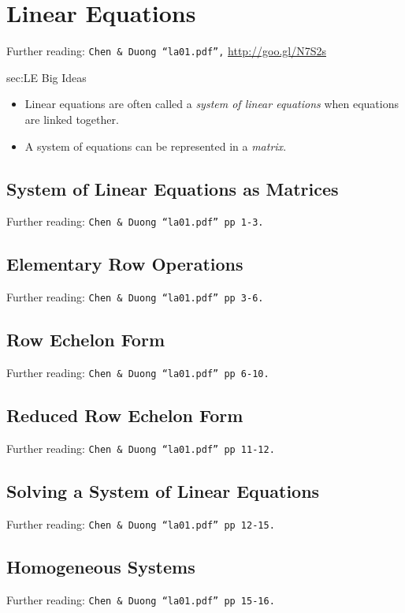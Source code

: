 \chapter{Linear Equations}
\label{chap:LE}

Further reading: \texttt{Chen \& Duong ``la01.pdf'',} \url{http://goo.gl/N7S2s}

\begin{bigideas}{sec:LE Big Ideas}
\begin{itemize}
  \item Linear equations are often called a \emph{system of linear equations}
  when equations are linked together.
  \item A system of equations can be represented in a \emph{matrix}.
\end{itemize}
\end{bigideas}

\section{System of Linear Equations as Matrices}
\label{sec:LE System of Linear Equations as Matrices}
Further reading: \texttt{Chen \& Duong ``la01.pdf'' pp 1-3.}

\section{Elementary Row Operations}
\label{sec:LE Elementary Row Operations}
Further reading: \texttt{Chen \& Duong ``la01.pdf'' pp 3-6.}

\section{Row Echelon Form}
\label{sec:LE Row Echelon Form}
Further reading: \texttt{Chen \& Duong ``la01.pdf'' pp 6-10.}

\section{Reduced Row Echelon Form}
\label{sec:LE Reduced Row Echelon Form}
Further reading: \texttt{Chen \& Duong ``la01.pdf'' pp 11-12.}

\section{Solving a System of Linear Equations}
\label{sec:LE Solving a System of Linear Equations}
Further reading: \texttt{Chen \& Duong ``la01.pdf'' pp 12-15.}

\section{Homogeneous Systems}
\label{sec:LE Homogeneous Systems}
Further reading: \texttt{Chen \& Duong ``la01.pdf'' pp 15-16.}
